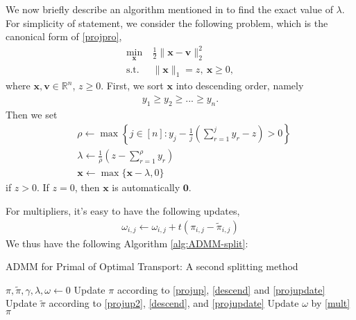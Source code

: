 \documentclass[english]{pkupaper}
\newenvironment{eqt}{\begin{equation}\begin{aligned}}{\end{aligned}\end{equation}}
\begin{document}
We now briefly describe an algorithm mentioned in \cite{projection} to find the exact value of $\lambda$. For simplicity of statement, we consider the following problem, which is the canonical form of \ref{projpro},
\begin{eqt}
\min_{\mathbf{x}}&\ \frac{1}{2}\|\mathbf{x}-\mathbf{v}\|_2^2 \\
\text{s.t.}&\ \|\mathbf{x}\|_1 = z,\ \mathbf{x}\geqslant 0,
\end{eqt}
where $\mathbf{x}, \mathbf{v}\in\mathbb{R}^n$, $z\geqslant 0$. First, we sort $\mathbf{x}$ into descending order, namely
\begin{eqt}
y_1 \geqslant y_2 \geqslant ... \geqslant y_n. \label{descend}
\end{eqt}
Then we set 
\begin{eqt}
& \rho \gets \max\left\{j\in[n]: y_j - \frac{1}{j}\left(\sum_{r=1}^jy_r-z\right) > 0\right\} \\
& \lambda \gets \frac{1}{\rho}\left(z-\sum_{r=1}^\rho y_r\right) \\
& \mathbf{x} \gets \max\{\mathbf{x}-\lambda, 0\} \label{projupdate}
\end{eqt}
if $z>0$. If $z=0$, then $\mathbf{x}$ is automatically $\mathbf{0}$.

For multipliers, it's easy to have the following updates,
\begin{eqt}
\omega_{i, j} \gets \omega_{i, j} + t(\pi_{i, j} - \tilde\pi_{i, j}) \label{mult}
\end{eqt}
We thus have the following Algorithm \ref{alg:ADMM-split}:
\begin{algorithm}
\caption{ADMM for Primal of Optimal Transport: A second splitting method}
\label{alg:ADMM-split}
\begin{algorithmic}[1]
\STATE $\pi, \tilde{\pi}, \gamma, \lambda, \omega\gets 0$
	\STATE Update $\pi$ according to \ref{projup}, \ref{descend} and \ref{projupdate}
	\STATE Update $\tilde\pi$ according to  \ref{projup2}, \ref{descend}, and \ref{projupdate}
	\STATE Update $\omega$ by \ref{mult}
\ENDWHILE
\RETURN $\pi$
\end{algorithmic}
\end{algorithm}
\end{document}
